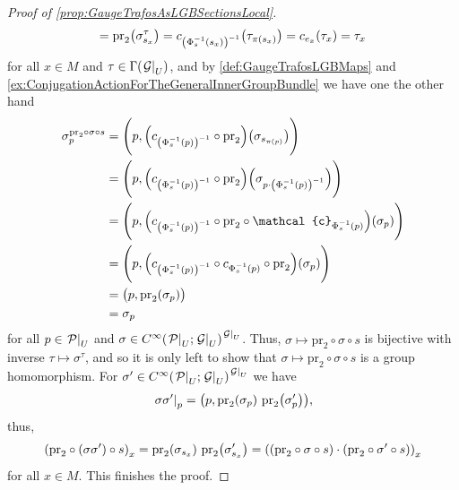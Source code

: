 \documentclass[reqno,a4paper,oneside]{amsart}
\theoremstyle{plain}
\theoremstyle{remark}
\theoremstyle{definition}
\begin{document}
\begin{proof}[Proof of \ref{prop:GaugeTrafosAsLGBSectionsLocal}]
\begin{equation*}
=
\mathrm{pr}_2\mleft(\sigma^\tau_{s_x}\mright)
=
c_{\mleft(\Phi^{-1}_{s}(s_x)\mright)^{-1}} \mleft( \tau_{\pi(s_x)} \mright)
=
c_{e_x}\mleft( \tau_x \mright)
=
\tau_x
\end{equation*}
for all $x \in M$ and $\tau \in \Gamma(\mleft.\mathcal{G}\mright|_U)$, and by \ref{def:GaugeTrafosLGBMaps} and \ref{ex:ConjugationActionForTheGeneralInnerGroupBundle} we have one the other hand
\begin{align*}
\sigma^{\mathrm{pr}_2 \circ \sigma \circ s}_p
&=
\Biggl(p, \mleft(c_{\mleft(\Phi^{-1}_{s}(p)\mright)^{-1}} \circ \mathrm{pr}_2 \mright) \mleft(\sigma_{s_{\pi(p)}}\mright) \Biggr)
\\
&=
\Biggl(p, \mleft(c_{\mleft(\Phi^{-1}_{s}(p)\mright)^{-1}} \circ \mathrm{pr}_2 \mright) \mleft(\sigma_{p \cdot \mleft( \Phi^{-1}_s(p) \mright)^{-1}}\mright) \Biggr)
\\
&=
\Biggl(p, \mleft(c_{\mleft(\Phi^{-1}_{s}(p)\mright)^{-1}} \circ \mathrm{pr}_2 \circ \mathcal{c}_{\Phi^{-1}_{s}(p)} \mright) \mleft(\sigma_{p}\mright) \Biggr)
\\
&=
\Biggl(p, \mleft(c_{\mleft(\Phi^{-1}_{s}(p)\mright)^{-1}} \circ c_{\Phi^{-1}_{s}(p)} \circ \mathrm{pr}_2 \mright) \mleft(\sigma_{p}\mright) \Biggr)
\\
&=
\bigl( p, \mathrm{pr}_2 (\sigma_p) \bigr)
\\
&=
\sigma_p
\end{align*}
for all $p \in \mleft.\mathcal{P}\mright|_U$ and $\sigma \in C^\infty \mleft( \mleft.\mathcal{P}\mright|_U; \mleft.\mathcal{G}\mright|_U \mright)^{\mleft.\mathcal{G}\mright|_U}$. Thus, $\sigma \mapsto \mathrm{pr}_2 \circ \sigma \circ s$ is bijective with inverse $\tau \mapsto \sigma^\tau$, and so it is only left to show that $\sigma \mapsto \mathrm{pr}_2 \circ \sigma \circ s$ is a group homomorphism. For $\sigma^\prime \in C^\infty \mleft( \mleft.\mathcal{P}\mright|_U; \mleft.\mathcal{G}\mright|_U \mright)^{\mleft.\mathcal{G}\mright|_U}$ we have
\begin{equation*}
\mleft.\sigma \sigma^\prime\mright|_p
=
\mleft( p, \mathrm{pr}_2( \sigma_p) ~ \mathrm{pr}_2\mleft( \sigma^\prime_p \mright) \mright),
\end{equation*}
thus,
\begin{equation*}
\mleft(\mathrm{pr}_2\circ \mleft( \sigma \sigma^\prime \mright) \circ s\mright)_x
=
\mathrm{pr}_2\mleft( \sigma_{s_x}\mright) ~ \mathrm{pr}_2\mleft( \sigma^\prime_{s_x} \mright)
=
\mleft( \mleft( \mathrm{pr}_2 \circ \sigma \circ s \mright) \cdot \mleft( \mathrm{pr}_2 \circ \sigma^\prime \circ s \mright) \mright)_x
\end{equation*}
for all $x \in M$. This finishes the proof.
\end{proof}
\end{document}
